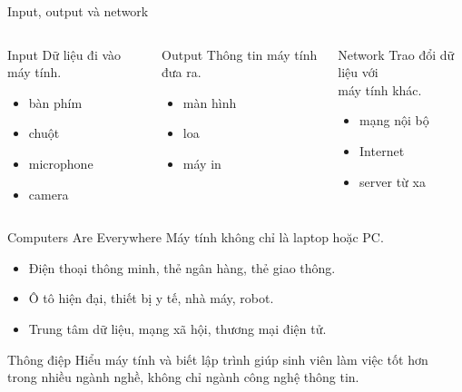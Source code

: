 \documentclass[aspectratio=169,10pt]{beamer}
\begin{document}
\begin{frame}{Input, output và network}
\small
\begin{columns}[T,onlytextwidth]
\begin{block}{Input}
Dữ liệu đi vào máy tính.
\begin{itemize}
  \item bàn phím
  \item chuột
  \item microphone
  \item camera
\end{itemize}
\end{block}

\begin{block}{Output}
Thông tin máy tính đưa ra.
\begin{itemize}
  \item màn hình
  \item loa
  \item máy in
\end{itemize}
\end{block}

\begin{block}{Network}
Trao đổi dữ liệu với\\
máy tính khác.
\begin{itemize}
  \item mạng nội bộ
  \item Internet
  \item server từ xa
\end{itemize}
\end{block}
\end{columns}
\end{frame}

\begin{frame}{Computers Are Everywhere}
Máy tính không chỉ là laptop hoặc PC.
\begin{itemize}
  \item Điện thoại thông minh, thẻ ngân hàng, thẻ giao thông.
  \item Ô tô hiện đại, thiết bị y tế, nhà máy, robot.
  \item Trung tâm dữ liệu, mạng xã hội, thương mại điện tử.
\end{itemize}

\begin{block}{Thông điệp}
\small Hiểu máy tính và biết lập trình giúp sinh viên làm việc tốt hơn\\
trong nhiều ngành nghề, không chỉ ngành công nghệ thông tin.
\end{block}
\end{frame}
\end{document}
